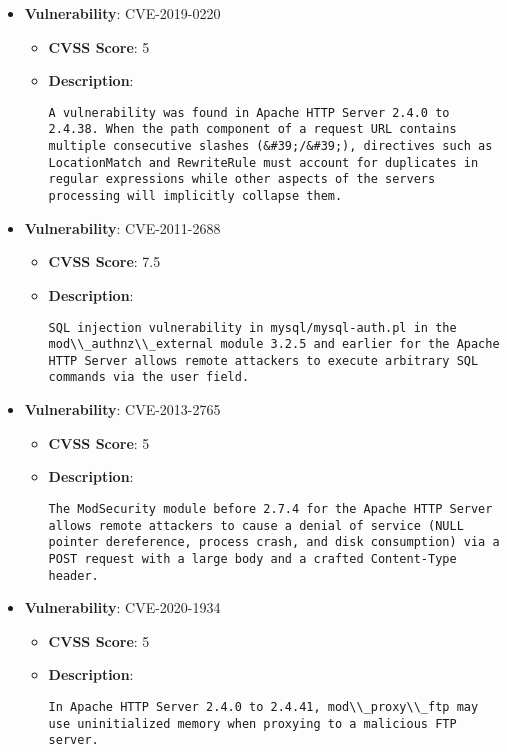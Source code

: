 \documentclass{article}
\begin{document}
\begin{itemize}
    
        \item \textbf{Vulnerability}: CVE-2019-0220
        \begin{itemize}
            \item \textbf{CVSS Score}:  5 
            \item \textbf{Description}:
            \parbox[t]{0.9\linewidth}{
                \verb|A vulnerability was found in Apache HTTP Server 2.4.0 to 2.4.38. When the path component of a request URL contains multiple consecutive slashes (&#39;/&#39;), directives such as LocationMatch and RewriteRule must account for duplicates in regular expressions while other aspects of the servers processing will implicitly collapse them.|
            }
        \end{itemize}
    
        \item \textbf{Vulnerability}: CVE-2011-2688
        \begin{itemize}
            \item \textbf{CVSS Score}:  7.5 
            \item \textbf{Description}:
            \parbox[t]{0.9\linewidth}{
                \verb|SQL injection vulnerability in mysql/mysql-auth.pl in the mod\\_authnz\\_external module 3.2.5 and earlier for the Apache HTTP Server allows remote attackers to execute arbitrary SQL commands via the user field.|
            }
        \end{itemize}
    
        \item \textbf{Vulnerability}: CVE-2013-2765
        \begin{itemize}
            \item \textbf{CVSS Score}:  5 
            \item \textbf{Description}:
            \parbox[t]{0.9\linewidth}{
                \verb|The ModSecurity module before 2.7.4 for the Apache HTTP Server allows remote attackers to cause a denial of service (NULL pointer dereference, process crash, and disk consumption) via a POST request with a large body and a crafted Content-Type header.|
            }
        \end{itemize}
    
        \item \textbf{Vulnerability}: CVE-2020-1934
        \begin{itemize}
            \item \textbf{CVSS Score}:  5 
            \item \textbf{Description}:
            \parbox[t]{0.9\linewidth}{
                \verb|In Apache HTTP Server 2.4.0 to 2.4.41, mod\\_proxy\\_ftp may use uninitialized memory when proxying to a malicious FTP server.|
            }
        \end{itemize}
    

\end{itemize}
\end{document}
